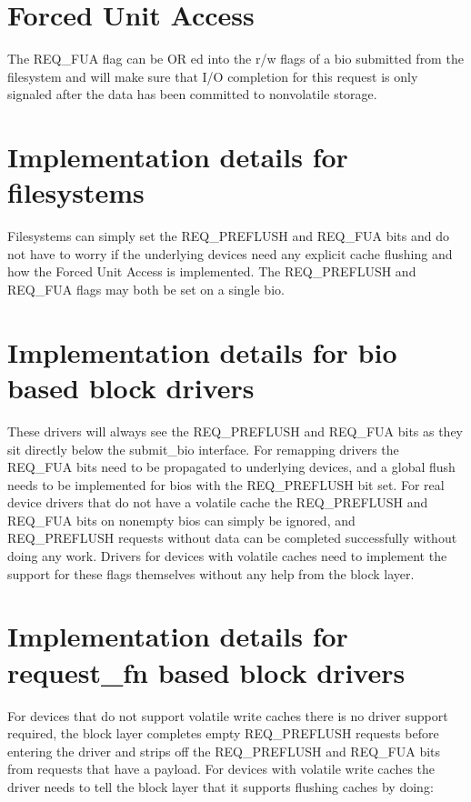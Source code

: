 \documentclass[a4paper,11pt,english]{sphinxmanual}
\begin{document}
\section{Forced Unit Access}
\label{\detokenize{writeback_cache_control:forced-unit-access}}
The REQ\_FUA flag can be OR ed into the r/w flags of a bio submitted from the
filesystem and will make sure that I/O completion for this request is only
signaled after the data has been committed to non\sphinxhyphen{}volatile storage.


\section{Implementation details for filesystems}
\label{\detokenize{writeback_cache_control:implementation-details-for-filesystems}}
Filesystems can simply set the REQ\_PREFLUSH and REQ\_FUA bits and do not have to
worry if the underlying devices need any explicit cache flushing and how
the Forced Unit Access is implemented.  The REQ\_PREFLUSH and REQ\_FUA flags
may both be set on a single bio.


\section{Implementation details for bio based block drivers}
\label{\detokenize{writeback_cache_control:implementation-details-for-bio-based-block-drivers}}
These drivers will always see the REQ\_PREFLUSH and REQ\_FUA bits as they sit
directly below the submit\_bio interface.  For remapping drivers the REQ\_FUA
bits need to be propagated to underlying devices, and a global flush needs
to be implemented for bios with the REQ\_PREFLUSH bit set.  For real device
drivers that do not have a volatile cache the REQ\_PREFLUSH and REQ\_FUA bits
on non\sphinxhyphen{}empty bios can simply be ignored, and REQ\_PREFLUSH requests without
data can be completed successfully without doing any work.  Drivers for
devices with volatile caches need to implement the support for these
flags themselves without any help from the block layer.


\section{Implementation details for request\_fn based block drivers}
\label{\detokenize{writeback_cache_control:implementation-details-for-request-fn-based-block-drivers}}
For devices that do not support volatile write caches there is no driver
support required, the block layer completes empty REQ\_PREFLUSH requests before
entering the driver and strips off the REQ\_PREFLUSH and REQ\_FUA bits from
requests that have a payload.  For devices with volatile write caches the
driver needs to tell the block layer that it supports flushing caches by
doing:
\end{document}
